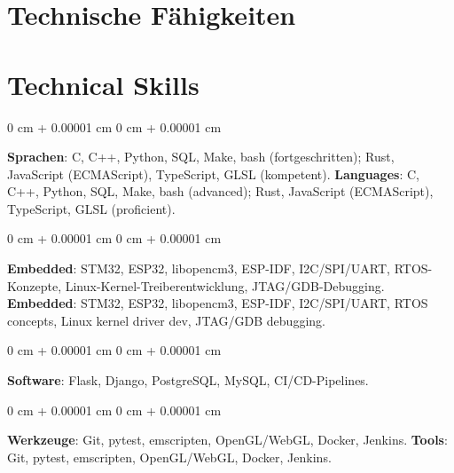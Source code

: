 \documentclass[10pt, letterpaper]{article}
\newenvironment{onecolentry}{
    \begin{adjustwidth}{
        0 cm + 0.00001 cm
    }{
        0 cm + 0.00001 cm
    }
}{
    \end{adjustwidth}
}
\begin{document}
    \ifdefined\german
    \section{Technische Fähigkeiten}
    \else
    \section{Technical Skills}
    \fi

        \begin{onecolentry}
            \ifdefined\german
            \textbf{Sprachen}: C, C++, Python, SQL, Make, bash (fortgeschritten); Rust, JavaScript (ECMAScript), TypeScript, GLSL (kompetent).
            \else
            \textbf{Languages}: C, C++, Python, SQL, Make, bash (advanced); Rust, JavaScript (ECMAScript), TypeScript, GLSL (proficient).
            \fi
        \end{onecolentry}

        \vspace{0.2 cm}

        \begin{onecolentry}
            \ifdefined\german
            \textbf{Embedded}: STM32, ESP32, libopencm3, ESP-IDF, I2C/SPI/UART, RTOS-Konzepte, Linux-Kernel-Treiberentwicklung, JTAG/GDB-Debugging.
            \else
            \textbf{Embedded}: STM32, ESP32, libopencm3, ESP-IDF, I2C/SPI/UART, RTOS concepts, Linux kernel driver dev, JTAG/GDB debugging.
            \fi
        \end{onecolentry}

        \vspace{0.2 cm}

        \begin{onecolentry}
            \textbf{Software}: Flask, Django, PostgreSQL, MySQL, CI/CD-Pipelines.
        \end{onecolentry}

        \vspace{0.2 cm}

        \begin{onecolentry}
            \ifdefined\german
            \textbf{Werkzeuge}: Git, pytest, emscripten, OpenGL/WebGL, Docker, Jenkins.
            \else
            \textbf{Tools}: Git, pytest, emscripten, OpenGL/WebGL, Docker, Jenkins.
            \fi
        \end{onecolentry}

        \vspace{0.2 cm}
\end{document}
